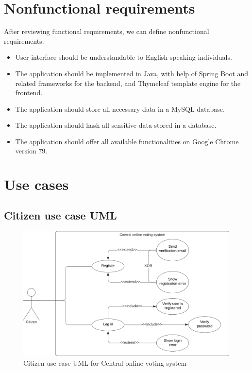 \documentclass[a4paper,twoside,12pt]{book}
\newcommand{\Title}{Central online voting system}
\begin{document}
  \section{Nonfunctional requirements}
    After reviewing functional requirements, we can define nonfunctional requirements:
    \begin{itemize}
      \item User interface should be understandable to English speaking individuals.
      \item The application should be implemented in Java, with help of Spring Boot and related frameworks for the backend, 
      and Thymeleaf template engine for the frontend.
      \item The application should store all necessary data in a MySQL database.
      \item The application should hash all sensitive data stored in a database.
      \item The application should offer all available functionalities on Google Chrome version 79.
    \end{itemize}
  \pagebreak

  \section{Use cases}
    \subsection{Citizen use case UML}
    \begin{figure}[h]
      \includegraphics[width=\linewidth]{citizen_uml.png}
      \caption{Citizen use case UML for \Title}
      \label{fig:citizen_uml}
    \end{figure}
\end{document}
